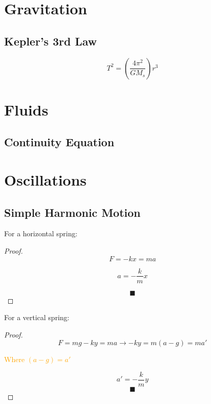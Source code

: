 \chapter*{Gravitation}

\section*{Kepler's 3rd Law}
  \begin{equation*}
    T^2 = \left(\frac{4\pi^2}{GM_s}\right)r^3
  \end{equation*}

\chapter*{Fluids}
\section*{Continuity Equation}

\chapter*{Oscillations}

\section*{Simple Harmonic Motion}

\begin{minipage}{0.5\textwidth}
    For a horizontal spring:
    \begin{proof}
      \begin{equation*}
        F = -kx = ma
      \end{equation*}

      \begin{equation*}
        a = - \frac{k}{m}x
      \end{equation*}

      \[\blacksquare\]
    \end{proof}

  \vspace{0.5cm}
  \end{minipage}
  \begin{minipage}{0.5\textwidth}
    For a vertical spring:

    \begin{proof}
      \begin{equation*}
        F = mg - ky = ma \rightarrow -ky = m (a - g) = ma'
      \end{equation*}

        \textcolor{orange}{Where $(a - g) = a'$}

      \begin{equation*}
        a' = - \frac{k}{m}y
      \end{equation*}
      \[\blacksquare\]
    \end{proof}
  \end{minipage}

